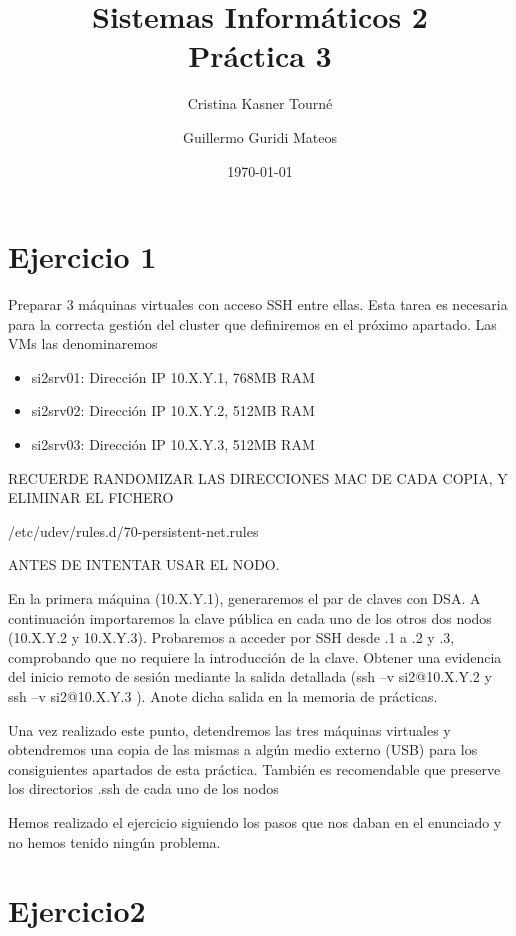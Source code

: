 \documentclass[a4paper, 10pt]{article}
\title{Sistemas Informáticos 2\\Práctica 3}
\author{Cristina Kasner Tourné\and Guillermo Guridi Mateos}
\date{\today}
\begin{document}
\maketitle
\newpage

\section{Ejercicio 1}
\begin{mdframed}
	Preparar 3 máquinas virtuales con acceso SSH entre ellas. Esta tarea es necesaria para la
	correcta gestión del cluster que definiremos en el próximo apartado. Las VMs las denominaremos
	\begin{itemize}
		\item si2srv01: Dirección IP 10.X.Y.1, 768MB RAM
		\item si2srv02: Dirección IP 10.X.Y.2, 512MB RAM
		\item si2srv03: Dirección IP 10.X.Y.3, 512MB RAM 
	\end{itemize}
	
	RECUERDE RANDOMIZAR LAS DIRECCIONES MAC DE CADA COPIA, Y ELIMINAR EL FICHERO 
	
	/etc/udev/rules.d/70-persistent-net.rules 
	
	ANTES DE INTENTAR USAR EL NODO.
	
	
	En la primera máquina (10.X.Y.1), generaremos el par de claves con DSA. A continuación importaremos la
	clave pública en cada uno de los otros dos nodos (10.X.Y.2 y 10.X.Y.3). Probaremos a acceder por SSH
	desde .1 a .2 y .3, comprobando que no requiere la introducción de la clave. Obtener una evidencia del
	inicio remoto de sesión mediante la salida detallada (ssh –v si2@10.X.Y.2 y ssh –v si2@10.X.Y.3 ). Anote
	dicha salida en la memoria de prácticas.
	
	
	Una vez realizado este punto, detendremos las tres máquinas virtuales y obtendremos una copia de
	las mismas a algún medio externo (USB) para los consiguientes apartados de esta práctica.
	También es recomendable que preserve los directorios .ssh de cada uno de los nodos
\end{mdframed}




Hemos realizado el ejercicio siguiendo los pasos que nos daban en el enunciado y no hemos tenido ningún problema.
\newpage
\section{Ejercicio2}
\end{document}
